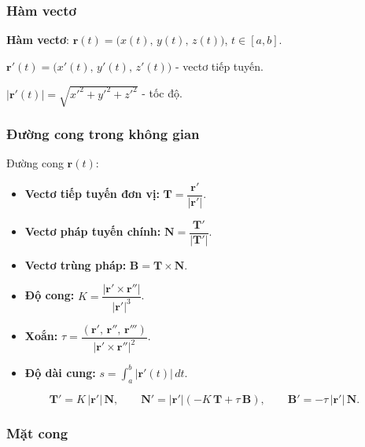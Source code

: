 \documentclass[12pt,a4paper]{article}
\begin{document}
\subsubsection{Hàm vectơ}

\begin{dinhnghia}
  \textbf{Hàm vectơ}: $\mathbf{r}(t) = \bigl(x(t),\, y(t),\, z(t)\bigr)$, $t \in [a, b]$.

  $\mathbf{r}'(t) = \bigl(x'(t),\, y'(t),\, z'(t)\bigr)$ - vectơ tiếp tuyến.

  $|\mathbf{r}'(t)| = \sqrt{x'^2 + y'^2 + z'^2}$ - tốc độ.
\end{dinhnghia}

\subsubsection{Đường cong trong không gian}

\begin{congthuc}
  Đường cong $\mathbf{r}(t)$:
  \begin{itemize}
    \item \textbf{Vectơ tiếp tuyến đơn vị:} $\mathbf{T} = \dfrac{\mathbf{r}'}{|\mathbf{r}'|}$.
    \item \textbf{Vectơ pháp tuyến chính:} $\mathbf{N} = \dfrac{\mathbf{T}'}{|\mathbf{T}'|}$.
    \item \textbf{Vectơ trùng pháp:} $\mathbf{B} = \mathbf{T} \times \mathbf{N}$.
    \item \textbf{Độ cong:} $K = \dfrac{|\mathbf{r}' \times \mathbf{r}''|}{|\mathbf{r}'|^3}$.
    \item \textbf{Xoắn:} $\tau = \dfrac{(\mathbf{r}',\, \mathbf{r}'',\, \mathbf{r}''')}{|\mathbf{r}' \times \mathbf{r}''|^2}$.
    \item \textbf{Độ dài cung:} $s = \displaystyle\int_a^b |\mathbf{r}'(t)|\,dt$.
  \end{itemize}
\end{congthuc}

\begin{dinhly}[title={Công thức Frenet}]
  \[
    \mathbf{T}' = K\,|\mathbf{r}'|\,\mathbf{N},\qquad
    \mathbf{N}' = |\mathbf{r}'|(-K\,\mathbf{T} + \tau\,\mathbf{B}),\qquad
    \mathbf{B}' = -\tau\,|\mathbf{r}'|\,\mathbf{N}.
  \]
\end{dinhly}

\subsubsection{Mặt cong}
\end{document}
